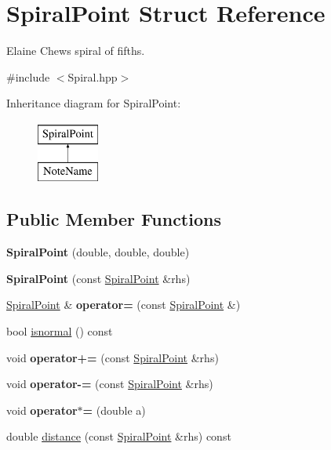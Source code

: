 \hypertarget{structSpiralPoint}{}\section{Spiral\+Point Struct Reference}
\label{structSpiralPoint}


Elaine Chew\textquotesingle{}s spiral of fifths.  




{\ttfamily \#include $<$Spiral.\+hpp$>$}

Inheritance diagram for Spiral\+Point\+:\begin{figure}[H]
\begin{center}
\leavevmode
\includegraphics[height=2.000000cm]{structSpiralPoint}
\end{center}
\end{figure}
\subsection*{Public Member Functions}
\begin{DoxyCompactItemize}
\item 
{\bfseries Spiral\+Point} (double, double, double)
\item 
{\bfseries Spiral\+Point} (const \mbox{\hyperlink{structSpiralPoint}{Spiral\+Point}} \&rhs)
\item 
\mbox{\hyperlink{structSpiralPoint}{Spiral\+Point}} \& {\bfseries operator=} (const \mbox{\hyperlink{structSpiralPoint}{Spiral\+Point}} \&)
\item 
bool \mbox{\hyperlink{group__segment_ga8d702bcd74b30d19929d1954087bd4b0}{isnormal}} () const
\item 
void {\bfseries operator+=} (const \mbox{\hyperlink{structSpiralPoint}{Spiral\+Point}} \&rhs)
\item 
void {\bfseries operator-\/=} (const \mbox{\hyperlink{structSpiralPoint}{Spiral\+Point}} \&rhs)
\item 
void {\bfseries operator$\ast$=} (double a)
\item 
double \mbox{\hyperlink{group__segment_ga71dccd6f3dd14b2c497e4198ea37d745}{distance}} (const \mbox{\hyperlink{structSpiralPoint}{Spiral\+Point}} \&rhs) const
\end{DoxyCompactItemize}
